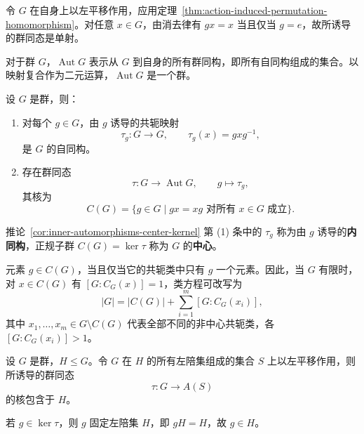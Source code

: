 \begin{purpleproof}
令 $G$ 在自身上以左平移作用，应用定理~\ref{thm:action-induced-permutation-homomorphism}。对任意 $x\in G$，由消去律有 $gx=x$ 当且仅当 $g=e$，故所诱导的群同态是单射。
\end{purpleproof}

\begin{purplenote}
对于群 $G$，$\operatorname{Aut}G$ 表示从 $G$ 到自身的所有群同构，即所有自同构组成的集合。以映射复合作为二元运算，$\operatorname{Aut}G$ 是一个群。
\end{purplenote}

\begin{corollary}\label{cor:inner-automorphisms-center-kernel}
设 $G$ 是群，则：
\begin{enumerate}[label=(\arabic*)]
  \item 对每个 $g\in G$，由 $g$ 诱导的共轭映射
  \[
    \tau_g:G\longrightarrow G,\qquad \tau_g(x)=gxg^{-1},
  \]
  是 $G$ 的自同构。
  \item 存在群同态
  \[
    \tau:G\longrightarrow\operatorname{Aut}G,\qquad g\longmapsto\tau_g,
  \]
  其核为
  \[
    C(G)=\{g\in G\mid gx=xg\text{ 对所有 }x\in G\text{ 成立}\}.
  \]
\end{enumerate}
\end{corollary}

\begin{purplenote}
推论~\ref{cor:inner-automorphisms-center-kernel} 第 (1) 条中的 $\tau_g$ 称为由 $g$ 诱导的\textbf{内同构}，正规子群 $C(G)=\ker\tau$ 称为 $G$ 的\textbf{中心}。

元素 $g\in C(G)$，当且仅当它的共轭类中只有 $g$ 一个元素。因此，当 $G$ 有限时，对 $x\in C(G)$ 有 $[G:C_G(x)]=1$，类方程可改写为
\[
  |G|=|C(G)|+\sum_{i=1}^{m}[G:C_G(x_i)],
\]
其中 $x_1,\ldots,x_m\in G\setminus C(G)$ 代表全部不同的非中心共轭类，各 $[G:C_G(x_i)]>1$。
\end{purplenote}

\begin{proposition}\label{prop:coset-action-kernel-contained-subgroup}
设 $G$ 是群，$H\leq G$。令 $G$ 在 $H$ 的所有左陪集组成的集合 $S$ 上以左平移作用，则所诱导的群同态
\[
  \tau:G\longrightarrow A(S)
\]
的核包含于 $H$。
\end{proposition}

\begin{purpleproof}
若 $g\in\ker\tau$，则 $g$ 固定左陪集 $H$，即 $gH=H$，故 $g\in H$。
\end{purpleproof}

